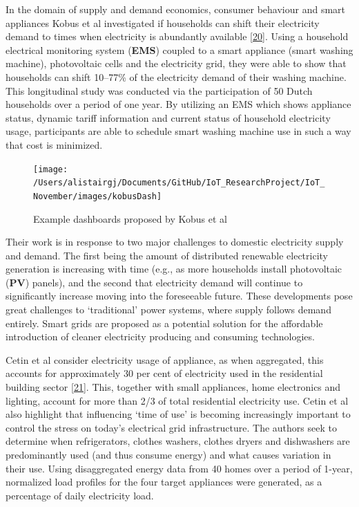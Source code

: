 \documentclass[11pt,]{article}
\begin{document}
In the domain of supply and demand economics, consumer behaviour and
smart appliances Kobus et al investigated if households can shift their
electricity demand to times when electricity is abundantly available
{[}\protect\hyperlink{ref-charlotteb.a.kobusReallifeAssessmentEffect2015}{20}{]}.
Using a household electrical monitoring system (\textbf{EMS}) coupled to
a smart appliance (smart washing machine), photovoltaic cells and the
electricity grid, they were able to show that households can shift
10--77\% of the electricity demand of their washing machine. This
longitudinal study was conducted via the participation of 50 Dutch
households over a period of one year. By utilizing an EMS which shows
appliance status, dynamic tariff information and current status of
household electricity usage, participants are able to schedule smart
washing machine use in such a way that cost is minimized.

\begin{figure}[H]

{\centering \texttt{[image: /Users/alistairgj/Documents/GitHub/IoT\_ResearchProject/IoT\_November/images/kobusDash]} 

}

\caption{Example dashboards proposed by Kobus et al}\label{fig:unnamed-chunk-1}
\end{figure}

Their work is in response to two major challenges to domestic
electricity supply and demand. The first being the amount of distributed
renewable electricity generation is increasing with time (e.g., as more
households install photovoltaic (\textbf{PV}) panels), and the second
that electricity demand will continue to significantly increase moving
into the foreseeable future. These developments pose great challenges to
`traditional' power systems, where supply follows demand entirely. Smart
grids are proposed as a potential solution for the affordable
introduction of cleaner electricity producing and consuming
technologies.

Cetin et al consider electricity usage of appliance, as when aggregated,
this accounts for approximately 30 per cent of electricity used in the
residential building sector
{[}\protect\hyperlink{ref-k.s.cetinApplianceDailyEnergy2014}{21}{]}.
This, together with small appliances, home electronics and lighting,
account for more than 2/3 of total residential electricity use. Cetin et
al also highlight that influencing `time of use' is becoming
increasingly important to control the stress on today's electrical grid
infrastructure. The authors seek to determine when refrigerators,
clothes washers, clothes dryers and dishwashers are predominantly used
(and thus consume energy) and what causes variation in their use. Using
disaggregated energy data from 40 homes over a period of 1-year,
normalized load profiles for the four target appliances were generated,
as a percentage of daily electricity load.
\end{document}
